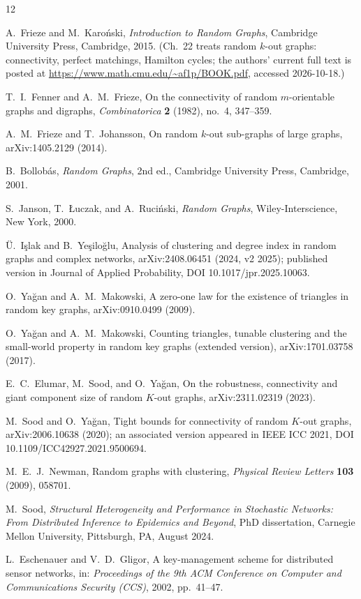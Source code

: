\documentclass[11pt,a4paper]{article}
\theoremstyle{definition}
\theoremstyle{definition}
\begin{document}
\begin{thebibliography}{12}

A.~Frieze and M.~Karo\'nski,
\emph{Introduction to Random Graphs},
Cambridge University Press, Cambridge, 2015.
(Ch.~22 treats random $k$-out graphs: connectivity, perfect matchings, Hamilton
cycles; the authors' current full text is posted at
\url{https://www.math.cmu.edu/~af1p/BOOK.pdf}, accessed 2026-10-18.)

T.~I.~Fenner and A.~M.~Frieze,
On the connectivity of random $m$-orientable graphs and digraphs,
\emph{Combinatorica} \textbf{2} (1982), no.~4, 347--359.

A.~M.~Frieze and T.~Johansson,
On random $k$-out sub-graphs of large graphs,
arXiv:1405.2129 (2014).

B.~Bollob\'as,
\emph{Random Graphs}, 2nd ed.,
Cambridge University Press, Cambridge, 2001.

S.~Janson, T.~{\L}uczak, and A.~Ruci\'nski,
\emph{Random Graphs},
Wiley-Interscience, New York, 2000.

{\"U}.~I{\c{s}}lak and B.~Ye{\c{s}}ilo{\u{g}}lu,
Analysis of clustering and degree index in random graphs and complex networks,
arXiv:2408.06451 (2024, v2 2025); published version in Journal of Applied
Probability, DOI 10.1017/jpr.2025.10063.

O.~Ya{\u{g}}an and A.~M.~Makowski,
A zero-one law for the existence of triangles in random key graphs,
arXiv:0910.0499 (2009).

O.~Ya{\u{g}}an and A.~M.~Makowski,
Counting triangles, tunable clustering and the small-world property in random key
graphs (extended version),
arXiv:1701.03758 (2017).

E.~C.~Elumar, M.~Sood, and O.~Ya{\u{g}}an,
On the robustness, connectivity and giant component size of random $K$-out graphs,
arXiv:2311.02319 (2023).

M.~Sood and O.~Ya{\u{g}}an,
Tight bounds for connectivity of random $K$-out graphs,
arXiv:2006.10638 (2020); an associated version appeared in IEEE ICC 2021,
DOI 10.1109/ICC42927.2021.9500694.

M.~E.~J.~Newman,
Random graphs with clustering,
\emph{Physical Review Letters} \textbf{103} (2009), 058701.

M.~Sood,
\emph{Structural Heterogeneity and Performance in Stochastic Networks: From
Distributed Inference to Epidemics and Beyond},
PhD dissertation, Carnegie Mellon University, Pittsburgh, PA, August 2024.

L.~Eschenauer and V.~D.~Gligor,
A key-management scheme for distributed sensor networks,
in: \emph{Proceedings of the 9th ACM Conference on Computer and Communications
Security (CCS)}, 2002, pp.~41--47.

\end{thebibliography}
\end{document}
